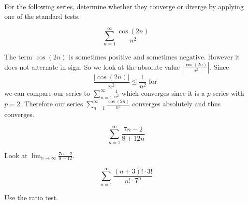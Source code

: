 \documentclass{ximera}
\author{Jason Miller}
\begin{document}
For the following series, determine whether they converge or diverge by applying one of the standard tests. 
\begin{exercise}

\begin{exercise}

\[
\sum^{\infty}_{n=1}\frac{\cos(2n)}{n^2}
\]

\begin{multipleChoice}
\end{multipleChoice}

\begin{feedback}[correct]
The term $\cos(2n)$ is sometimes positive and sometimes negative. However it does not alternate in sign. So we look at the absolute value $|\frac{\cos(2n)}{n^2}|$. Since 
\[
\frac{|\cos(2n)|}{n^2} \leq \frac{1}{n^2} \text{ for } 
\] 
we  can compare our series to $\sum^{\infty}_{n=1} \frac{1}{n^2}$ which converges since it is a $p$-series with $p=2$. Therefore our series
$\sum^{\infty}_{n=1} \frac{ \cos(2n)}{n^2}$ converges absolutely and thus converges. 
\end{feedback}
\end{exercise}


\begin{exercise}

\[
\sum^{\infty}_{n=1} \frac{ 7n-2}{8+12n}
\]

\begin{multipleChoice}
\end{multipleChoice}

\begin{feedback}[correct]
Look at $\lim_{n \to \infty} \frac{7n-2}{8+12}$. 
\end{feedback}
\end{exercise}


\begin{exercise}

\[
\sum^{\infty}_{n=1} \frac{(n+3)! \cdot 3!}{n! \cdot 7^n}
\]

\begin{multipleChoice}
\end{multipleChoice}

\begin{feedback}[correct]
Use the ratio test.
\end{feedback}
\end{exercise}


\end{exercise}
\end{document}
